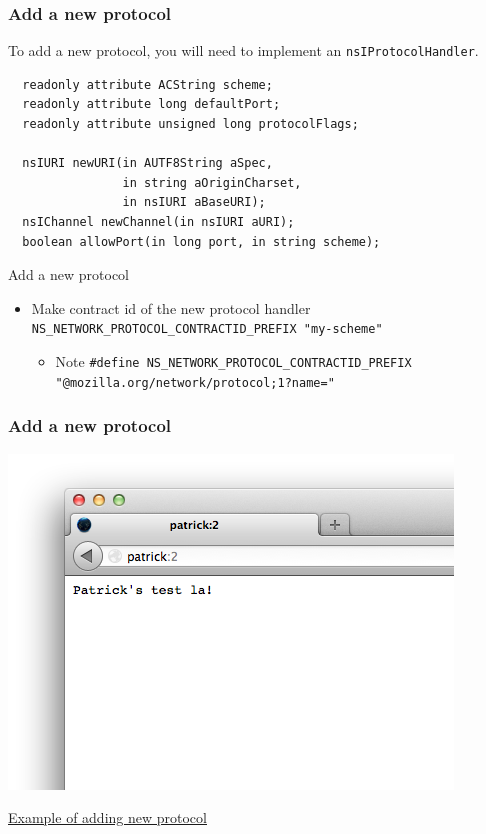 \documentclass{beamer}
\begin{document}
\begin{frame}[fragile]
  \frametitle{Add a new protocol}
  To add a new protocol, you will need to implement an \texttt{nsIProtocolHandler}.
\begin{verbatim}
  readonly attribute ACString scheme;
  readonly attribute long defaultPort;
  readonly attribute unsigned long protocolFlags;

  nsIURI newURI(in AUTF8String aSpec,
                in string aOriginCharset,
                in nsIURI aBaseURI);
  nsIChannel newChannel(in nsIURI aURI);
  boolean allowPort(in long port, in string scheme);
\end{verbatim}
\end{frame}

\begin{frame}{Add a new protocol}
  \begin{itemize}
  \item Make contract id of the new protocol handler \texttt{NS\_NETWORK\_PROTOCOL\_CONTRACTID\_PREFIX "my-scheme"}
    \begin{itemize}
    \item Note \texttt{\#define NS\_NETWORK\_PROTOCOL\_CONTRACTID\_PREFIX "@mozilla.org/network/protocol;1?name="}
    \end{itemize}
  \end{itemize}
\end{frame}

\begin{frame}[fragile]
  \frametitle{Add a new protocol}
  \begin{center}
    \includegraphics[height=0.7\textheight]{patrick-protocol.png}

    \href{https://github.com/kk1fff/mozilla-central/commit/b5b203307c54862f67774e588475939961258f0a}{Example of adding new protocol}
  \end{center}
\end{frame}
\end{document}
